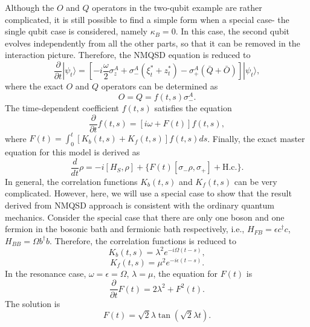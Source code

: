 \documentclass[preprint]{elsarticle}
\begin{document}
Although the $O$ and $Q$ operators in the two-qubit example are
rather complicated, it is still possible to find a simple form when
a special case- the single qubit case is considered, namely $\kappa_{B}=0$.
In this case, the second qubit evolves independently from all the
other parts, so that it can be removed in the interaction picture.
Therefore, the NMQSD equation is reduced to
\begin{equation}
\frac{\partial}{\partial t}|\psi_{t}\rangle=[-i\frac{\omega}{2}\sigma_{z}^{A}+\sigma_{-}^{A}(\xi_{t}^{\ast}+z_{t}^{*})-\sigma_{+}^{A}(\bar{Q}+\bar{O})]|\psi_{t}\rangle,
\end{equation}
where the exact $O$ and $Q$ operators can be determined as
\begin{equation}
O=Q=f(t,s)\sigma_{-}^{A}.
\end{equation}
The time-dependent coefficient $f(t,s)$ satisfies the equation
\begin{equation}
\frac{\partial}{\partial t}f(t,s)=[i\omega+F(t)]f(t,s),
\end{equation}
where $F(t)=\int_{0}^{t}[K_{b}(t,s)+K_{f}(t,s)]f(t,s)ds$. Finally,
the exact master equation for this model is derived as
\begin{equation}
\frac{d}{dt}\rho=-i[H_{S},\rho]+\{F(t)[\sigma_{-}\rho,\sigma_{+}]+\mathrm{H.c.}\}.\label{MEQ1qu}
\end{equation}
In general, the correlation functions $K_{b}(t,s)$ and $K_{f}(t,s)$
can be very complicated. However, here, we will use a special case to
show that the result derived from NMQSD approach is consistent with
the ordinary quantum mechanics. Consider the special case that there
are only one boson and one fermion in the bosonic bath and fermionic
bath respectively, i.e., $H_{FB}=\epsilon c^{\dagger}c$, $H_{BB}=\Omega b^{\dagger}b$.
Therefore, the correlation functions is reduced to
\begin{equation}
K_{b}(t,s)=\lambda^{2}e^{-i\Omega(t-s)},
\end{equation}
\begin{equation}
K_{f}(t,s)=\mu^{2}e^{-i\epsilon(t-s)}.
\end{equation}
In the resonance case, $\omega=\epsilon=\Omega$, $\lambda=\mu$,
the equation for $F(t)$ is
\begin{equation}
\frac{\partial}{\partial t}F(t)=2\lambda^{2}+F^{2}(t).
\end{equation}
The solution is
\begin{equation}
F(t)=\sqrt{2}\lambda\tan(\sqrt{2}\lambda t).
\end{equation}
\end{document}
